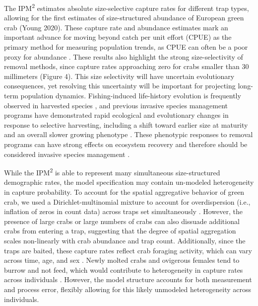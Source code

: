 \documentclass{article}
\begin{document}
The IPM\textsuperscript{2} estimates absolute size-selective capture rates for different trap types, allowing for the first estimates of size-structured abundance of European green crab (Young 2020). These capture rate and abundance estimates mark an important advance for moving beyond catch per unit effort (CPUE) as the primary method for measuring population trends, as CPUE can often be a poor proxy for abundance \parencite{harley2001catch}. These results also highlight the strong size-selectivity of removal methods, since capture rates approaching zero for crabs smaller than 30 millimeters (Figure 4). This size selectivity will have uncertain evolutionary consequences, yet resolving this uncertainty will be important for projecting long-term population dynamics. Fishing-induced life-history evolution is frequently observed in harvested species \parencite{enberg2012fishing}, and previous invasive species management programs have demonstrated rapid ecological and evolutionary changes in response to selective harvesting, including a shift toward earlier size at maturity and an overall slower growing phenotype \parencite{evangelista2015impacts}. These phenotypic responses to removal programs can have strong effects on ecosystem recovery and therefore should be considered invasive species management \parencite{zavorka2020phenotypic}.

While the IPM\textsuperscript{2} is able to represent many simultaneous size-structured demographic rates, the model specification may contain un-modeled heterogeneity in capture probability. To account for the spatial aggregative behavior of green crab, we used a Dirichlet-multinomial mixture to account for overdispersion (i.e., inflation of zeros in count data) across traps set simultaneously \parencite{thorson2017model, young2019life}. However, the presence of large crabs or large numbers of crabs can also dissuade additional crabs from entering a trap, suggesting that the degree of spatial aggregation scales non-linearly with crab abundance and trap count. Additionally, since the traps are baited, these capture rates reflect crab foraging activity, which can vary across time, age, and sex \parencite{young2019life}. Newly molted crabs and ovigerous females tend to burrow and not feed, which would contribute to heterogeneity in capture rates across individuals \parencite{ropes1968feeding}. However, the model structure accounts for both measurement and process error, flexibly allowing for this likely unmodeled heterogeneity across individuals.  
\end{document}
